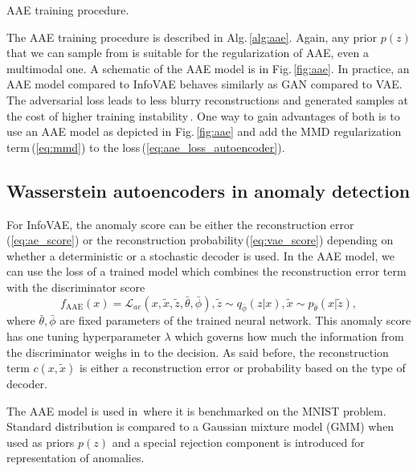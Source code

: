 \begin{algorithm}


\caption{AAE training procedure.}
\label{alg:aae}
\end{algorithm}

The AAE training procedure is described in Alg.\,\ref{alg:aae}.
Again, any prior $p(z)$ that we can sample from is suitable for the
regularization of AAE, even a multimodal one. A schematic of the AAE
model is in Fig.\,\ref{fig:aae}. In practice, an AAE model compared
to InfoVAE behaves similarly as GAN compared to VAE. The adversarial
loss leads to less blurry reconstructions and generated samples at
the cost of higher training instability\,\cite{tolstikhin2017wasserstein}.
One way to gain advantages of both is to use an AAE model as depicted
in Fig.\,\ref{fig:aae} and add the MMD regularization term\,(\ref{eq:mmd})
to the loss\,(\ref{eq:aae_loss_autoencoder}).


\subsection{Wasserstein autoencoders in anomaly detection}

For InfoVAE, the anomaly score can be either the reconstruction error\,(\ref{eq:ae_score})
or the reconstruction probability\,(\ref{eq:vae_score}) depending
on whether a deterministic or a stochastic decoder is used. In the
AAE model, we can use the loss of a trained model which combines the
reconstruction error term with the discriminator score 
\begin{equation}
f_{\text{AAE}}(x)=\mathcal{L}_{ae}(x,\tilde{x},\tilde{z},\bar{\theta},\bar{\phi}),\tilde{z}\sim q_{\bar{\phi}}(z|x),\tilde{x}\sim p_{\bar{\theta}}(x|\tilde{z}),\label{eq:aae_score}
\end{equation}
where $\bar{\theta},\bar{\phi}$ are fixed parameters of the trained
neural network. This anomaly score has one tuning hyperparameter $\lambda$
which governs how much the information from the discriminator weighs
in to the decision. As said before, the reconstruction term $c(x,\tilde{x})$
is either a reconstruction error or probability based on the type
of decoder.

The AAE model is used in\,\cite{leveau2017adversarial} where it
is benchmarked on the MNIST problem. Standard distribution is compared
to a Gaussian mixture model (GMM) when used as priors $p(z)$ and
a special rejection component is introduced for representation of
anomalies. 

